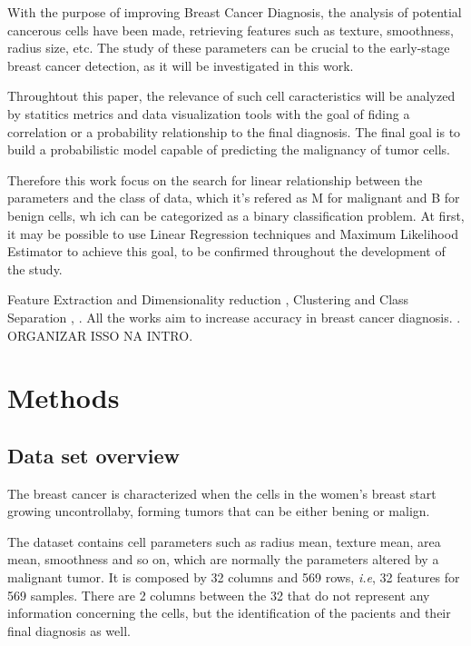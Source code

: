 \documentclass[conference]{IEEEtran}
\newcommand{\reviewUrgent}[1]{{\color{red} #1}} %
\begin{document}
With the purpose of improving Breast Cancer Diagnosis, the analysis of potential cancerous cells have been made,
retrieving features such as texture, smoothness, radius size, etc. The study of these parameters can be crucial 
to the early-stage breast cancer detection, as it will be investigated in this work. 

Throughtout this paper, the relevance of such cell caracteristics will be analyzed by statitics metrics and data visualization tools 
with the goal of fiding a correlation or a probability relationship to the final diagnosis. The final goal is to 
build a probabilistic model capable of predicting the malignancy of tumor cells.

Therefore this work focus on the search for linear relationship between the parameters 
and the class of data, which it's refered as M for malignant and B for benign cells, wh ich can be 
categorized as a binary classification problem. At first, it may be possible to use 
Linear Regression techniques and Maximum Likelihood Estimator to achieve this goal, to be 
confirmed throughout the development of the study.

Feature Extraction and Dimensionality reduction \cite{Street1993}, 
Clustering and Class Separation \cite{Mangasarian1995}, \cite{Bennett1992}.
All the works aim to increase accuracy in breast cancer diagnosis.
\cite{Wolberg1994}.
\reviewUrgent{ORGANIZAR ISSO NA INTRO.}


\section{Methods}

\subsection{Data set overview}

The breast cancer is characterized when the cells in the women's breast start
growing uncontrollaby, forming tumors that can be either bening or malign. 

The dataset contains cell parameters such as radius mean, texture mean, area mean, 
smoothness and so on, which are normally the parameters altered by a malignant
tumor. 
It is composed by 32 columns and 569 rows, \textit{i.e}, 32 features 
for 569 samples. There are 2 columns between the 32 that do not represent any 
information concerning the cells, but the identification of the pacients and 
their final diagnosis as well. 
\end{document}
